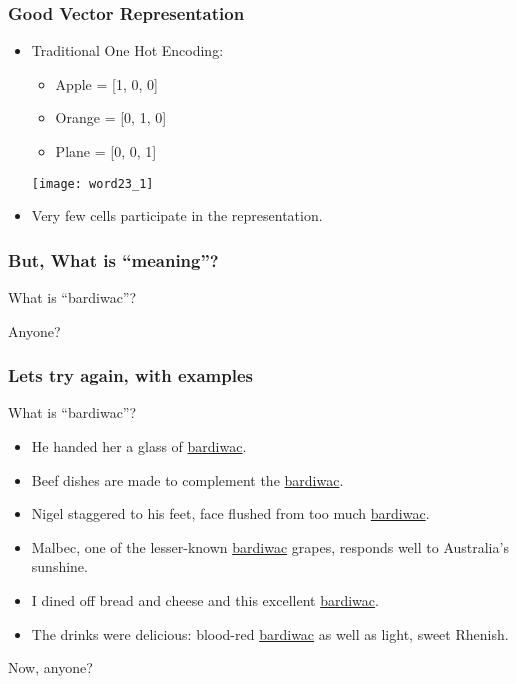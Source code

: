 \begin{frame}[fragile]\frametitle{Good Vector Representation}
\begin{itemize}
\item Traditional One Hot Encoding:
	\begin{itemize}
	\item Apple = [1, 0, 0]
	\item Orange = [0, 1, 0]
	\item Plane = [0, 0, 1]
	\end{itemize}
\begin{center}
\texttt{[image: word23\_1]}
\end{center}
\item Very few cells participate in the representation.
\end{itemize}
\end{frame}


\begin{frame}[fragile]\frametitle{But, What is ``meaning''?}
What is ``bardiwac''?

Anyone?
\end{frame}

\begin{frame}[fragile]\frametitle{Lets try again, with examples}
What is ``bardiwac''?

\begin{itemize}
\item He handed her a glass of \underline{bardiwac}. 
\item Beef dishes are made to complement the \underline{bardiwac}.
\item Nigel staggered to his feet, face flushed from too much
\underline{bardiwac}. 
\item Malbec, one of the lesser-known \underline{bardiwac} grapes,
responds well to Australia’s sunshine. 
\item I dined off bread and cheese and this excellent \underline{bardiwac}. 
\item The drinks were delicious: blood-red \underline{bardiwac} as well as 
light, sweet Rhenish. 
\end{itemize}

Now, anyone?
\end{frame}

